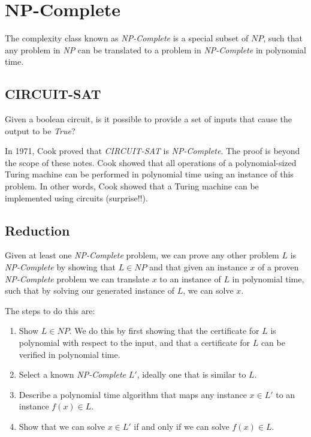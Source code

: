 \chapter{NP-Complete}

The complexity class known as \emph{NP-Complete} is a special subset
of $NP$, such that any problem in \emph{NP} can be translated to a
problem in \emph{NP-Complete} in polynomial time.

\section{CIRCUIT-SAT}

Given a boolean circuit, is it possible to provide a set of inputs
that cause the output to be \emph{True}?

In 1971, Cook proved that \emph{CIRCUIT-SAT} is \emph{NP-Complete}.
The proof is beyond the scope of these notes.  Cook showed that all
operations of a polynomial-sized Turing machine can be performed in
polynomial time using an instance of this problem.  In other words,
Cook showed that a Turing machine can be implemented using circuits
(surprise!!).

\section{Reduction}

Given at least one \emph{NP-Complete} problem, we can prove any other
problem $L$ is \emph{NP-Complete} by showing that $L \in NP$ and that
given an instance $x$ of a proven \emph{NP-Complete} problem we can
translate $x$ to an instance of $L$ in polynomial time, such that by
solving our generated instance of $L$, we can solve $x$.

The steps to do this are:

\begin{enumerate}
\item Show $L \in NP$.  We do this by first showing that the
  certificate for $L$ is polynomial with respect to the input, and
  that a certificate for $L$ can be verified in polynomial time.

\item Select a known \emph{NP-Complete} $L'$, ideally one that is
  similar to $L$.

\item Describe a polynomial time algorithm that maps any instance $x
  \in L'$ to an instance $f(x) \in L$.

\item Show that we can solve $x \in L'$ if and only if we can solve
  $f(x) \in L$.
\end{enumerate}

